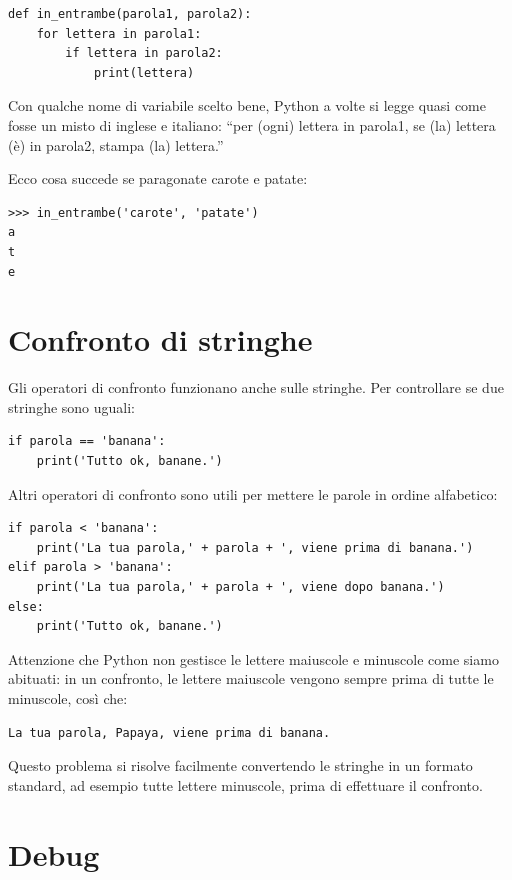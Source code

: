\documentclass[10pt]{book}
\begin{document}
\begin{verbatim}
def in_entrambe(parola1, parola2):
    for lettera in parola1:
        if lettera in parola2:
            print(lettera)
\end{verbatim}
%
Con qualche nome di variabile scelto bene, Python a volte si legge quasi come fosse un misto di inglese e italiano: ``per (ogni) lettera in parola1, se (la) lettera (è) in parola2, stampa (la) lettera.''

Ecco cosa succede se paragonate carote e patate:

\begin{verbatim}
>>> in_entrambe('carote', 'patate')
a
t
e
\end{verbatim}
%

\section{Confronto di stringhe}

Gli operatori di confronto funzionano anche sulle stringhe. Per controllare se
due stringhe sono uguali:

\begin{verbatim}
if parola == 'banana':
    print('Tutto ok, banane.')
\end{verbatim}
%
Altri operatori di confronto sono utili per mettere le parole in ordine alfabetico:

\begin{verbatim}
if parola < 'banana':
    print('La tua parola,' + parola + ', viene prima di banana.')
elif parola > 'banana':
    print('La tua parola,' + parola + ', viene dopo banana.')
else:
    print('Tutto ok, banane.')
\end{verbatim}
%
Attenzione che Python non gestisce le lettere maiuscole e minuscole come siamo abituati: in un confronto, le lettere maiuscole vengono sempre prima di tutte le minuscole, così che:

\begin{verbatim}
La tua parola, Papaya, viene prima di banana.
\end{verbatim}
%
Questo problema si risolve facilmente convertendo le stringhe in un formato standard, ad esempio tutte lettere minuscole, prima di effettuare il confronto.


\section{Debug}
\end{document}
